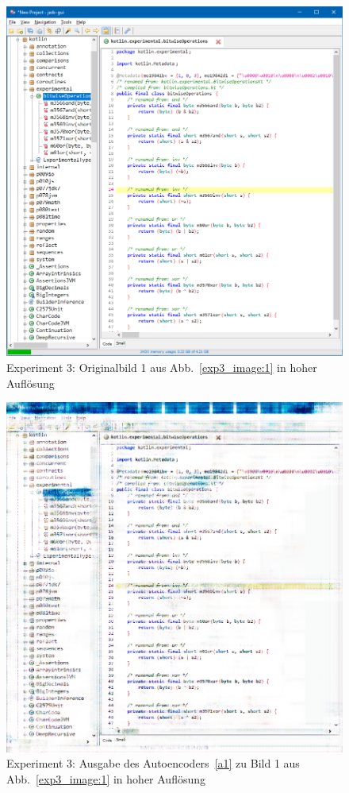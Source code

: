 \begin{figure} [ht]
  \centering
  \includegraphics[width=\textwidth]{bilder/result_exp3/1.png}

  \caption{Experiment 3: Originalbild 1 aus Abb.~\ref{exp3_image:1} in hoher Auflösung}
\end{figure}

\begin{figure} [ht]
  \centering
  \includegraphics[width=\textwidth]{bilder/result_exp3/1_pred_a1.png}

  \caption{Experiment 3: Ausgabe des Autoencoders~\ref{a1} zu Bild 1 aus Abb.~\ref{exp3_image:1} in hoher Auflösung}
\end{figure}

